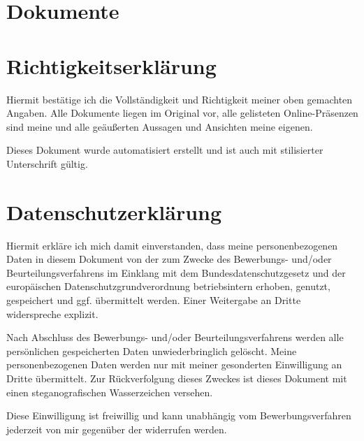 \documentclass[
	a4paper,
	fontsize=12
]{scrartcl}
\begin{document}
\CVAboutMe
\newpage


\section{Dokumente}

\newcommand{\RemainingPageHeight}{\dimexpr\pagegoal-\pagetotal-\baselineskip\relax}

\newcommand{\PageFillImage}[1]{%
	\begin{minipage}[b]{\textwidth}
		\center\fcolorbox{RoyalBlue}{white}{
			\texttt{[image: \\CVDataPath/\#1]}
		}
	\end{minipage}
	\newpage
}%

\CVDocs

\section{Richtigkeitserklärung}
Hiermit bestätige ich die Vollständigkeit und Richtigkeit meiner oben gemachten
Angaben. Alle Dokumente liegen im Original vor, alle gelisteten Online-Präsenzen
sind meine und alle geäußerten Aussagen und Ansichten meine eigenen.

Dieses Dokument wurde automatisiert erstellt und ist auch mit stilisierter
Unterschrift gültig.

\section{Datenschutzerklärung}
Hiermit erkläre ich mich damit einverstanden, dass meine personenbezogenen Daten
in diesem Dokument von der \RecpCompany{} zum Zwecke des Bewerbungs- und/oder
Beurteilungsverfahrens im Einklang mit dem Bundesdatenschutzgesetz und der
europäischen Datenschutzgrundverordnung betriebsintern erhoben, genutzt,
gespeichert und ggf. übermittelt werden.
Einer Weitergabe an Dritte widerspreche explizit.

Nach Abschluss des Bewerbungs- und/oder Beurteilungsverfahrens werden alle
persönlichen gespeicherten Daten unwiederbringlich gelöscht.
Meine personenbezogenen Daten werden nur mit meiner gesonderten Einwilligung
an Dritte übermittelt. Zur Rückverfolgung dieses Zweckes ist dieses Dokument
mit einen steganografischen Wasserzeichen versehen.

Diese Einwilligung ist freiwillig und kann unabhängig vom Bewerbungsverfahren
jederzeit von mir gegenüber der \RecpCompany{} widerrufen werden.
\vfill
\MySignature
\vfill\vfill\vfill
\end{document}

